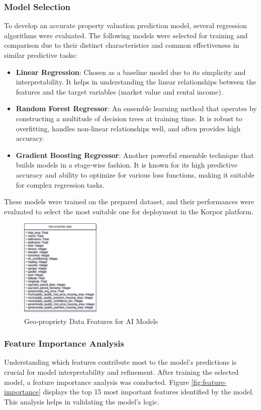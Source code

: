\subsubsection{Model Selection}
To develop an accurate property valuation prediction model, several regression algorithms were evaluated. The following models were selected for training and comparison due to their distinct characteristics and common effectiveness in similar predictive tasks:
\begin{itemize}
    \item \textbf{Linear Regression}: Chosen as a baseline model due to its simplicity and interpretability. It helps in understanding the linear relationships between the features and the target variables (market value and rental income).
    \item \textbf{Random Forest Regressor}: An ensemble learning method that operates by constructing a multitude of decision trees at training time. It is robust to overfitting, handles non-linear relationships well, and often provides high accuracy.
    \item \textbf{Gradient Boosting Regressor}: Another powerful ensemble technique that builds models in a stage-wise fashion. It is known for its high predictive accuracy and ability to optimize for various loss functions, making it suitable for complex regression tasks.
\end{itemize}
These models were trained on the prepared dataset, and their performances were evaluated to select the most suitable one for deployment in the Korpor platform.

\begin{figure}[htbp]
    \centering
    \includegraphics[width=0.35\textwidth]{images/geo-propriety-data.png} %
    \caption{Geo-propriety Data Features for AI Models}
    \label{fig:geo-propriety-data}
\end{figure}
\newpage
\subsubsection{Feature Importance Analysis}
Understanding which features contribute most to the model's predictions is crucial for model interpretability and refinement. After training the selected model, a feature importance analysis was conducted. Figure \ref{fig:feature-importance} displays the top 15 most important features identified by the model. This analysis helps in validating the model's logic.


